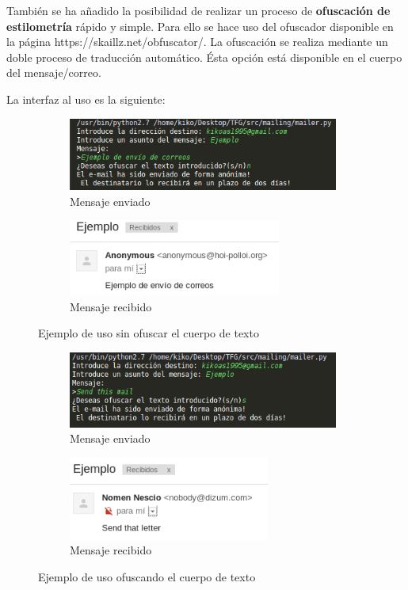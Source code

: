 También se ha añadido la posibilidad de realizar un proceso de \textbf{ofuscación de estilometría} rápido y simple. Para ello se hace uso del ofuscador disponible en la página https://skaillz.net/obfuscator/. La ofuscación se realiza mediante un doble proceso de traducción automático. 
Ésta opción está disponible en el cuerpo del mensaje/correo.

La interfaz al uso es la siguiente:

\begin{figure}[H]
	\centering
	\begin{subfigure}{0.5\textwidth}
		\centering
		\mbox{\includegraphics[width=3.50in]{images/sin_ofuscar.png}}
		\caption{Mensaje enviado}
		\label{fig:sub1}
	\end{subfigure}%
	\begin{subfigure}{0.5\textwidth}
		\centering
		\mbox{\includegraphics[width=2.75in]{images/recibido_sin.png}}
		\caption{Mensaje recibido}
		\label{fig:sub2}
	\end{subfigure}
	\caption{Ejemplo de uso sin ofuscar el cuerpo de texto}
	\label{fig:mailer}
\end{figure}

\begin{figure}[H]
	\centering
	\begin{subfigure}{0.5\textwidth}
		\centering
		\mbox{\includegraphics[width=3.50in]{images/con_ofuscar.png}}
		\caption{Mensaje enviado}
		\label{fig:sub1}
	\end{subfigure}%
	\begin{subfigure}{0.5\textwidth}
		\centering
		\mbox{\includegraphics[width=2.6in]{images/recibido_con.png}}
		\caption{Mensaje recibido}
		\label{fig:sub2}
	\end{subfigure}
	\caption{Ejemplo de uso ofuscando el cuerpo de texto}
	\label{fig:mailer}
\end{figure}


